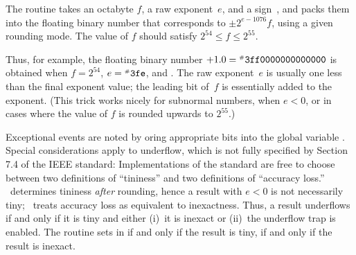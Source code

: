 The  routine takes an octabyte $f$, a raw exponent~$e$,
and a sign~, and packs them
into the floating binary number that corresponds to
$\pm2^{e-1076}f$, using a given rounding mode.
The value of $f$ should satisfy $2^{54}\le f\le 2^{55}$.

Thus, for example, the floating binary number $+1.0=\hbox{$^{\scriptscriptstyle\#}$\tt3ff0000000000000}$
is obtained when $f=2^{54}$, $e=\hbox{$^{\scriptscriptstyle\#}$\tt3fe}$, and .
The raw exponent~$e$ is usually one less than
the final exponent value; the leading bit of~$f$ is essentially added
to the exponent. (This trick works nicely for subnormal numbers, when
$e<0$, or in cases where the value of $f$ is rounded upwards to $2^{55}$.)

Exceptional events are noted by oring appropriate bits into
the global variable . Special considerations apply to
underflow, which is not fully specified by Section 7.4 of the IEEE standard:
Implementations of the standard are free to choose between two definitions
of ``tininess'' and two definitions of ``accuracy loss.''
\MMIX\ determines tininess {\it after\/} rounding, hence a result with
$e<0$ is not necessarily tiny; \MMIX\ treats accuracy loss as equivalent
to inexactness. Thus, a result underflows if and only if
it is tiny and either (i)~it is inexact or (ii)~the underflow trap is enabled.
The  routine sets  in  if and
only if the result is
tiny,  if and only if the result is inexact.

